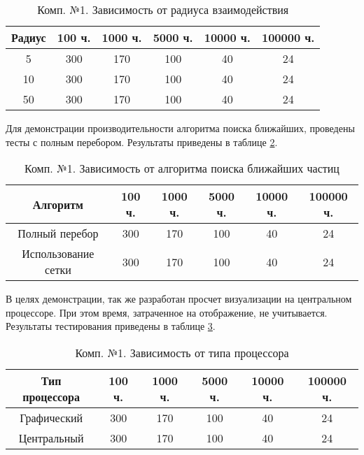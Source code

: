 \begin{table}[H]
  \caption{\label{tab:fst:radius}Комп. №1. Зависимость от радиуса взаимодействия}
  \begin{center}
    \begin{tabular}{|c|c|c|c|c|c|}
      \hline
      Радиус & 100 ч. & 1000 ч. & 5000 ч. & 10000 ч. & 100000 ч. \\
      \hline
      5 & 300 & 170 & 100 & 40 & 24 \\
      10 & 300 & 170 & 100 & 40 & 24 \\
      50 & 300 & 170 & 100 & 40 & 24 \\
      \hline
    \end{tabular}
  \end{center}
\end{table}

Для демонстрации производительности алгоритма поиска ближайших, проведены
тесты с полным перебором. Результаты приведены в таблице \ref{tab:fst:algorithm}.

\begin{table}[H]
  \caption{\label{tab:fst:algorithm}Комп. №1. Зависимость от алгоритма поиска ближайших частиц}
  \begin{center}
    \begin{tabular}{|c|c|c|c|c|c|}
      \hline
      Алгоритм & 100 ч. & 1000 ч. & 5000 ч. & 10000 ч. & 100000 ч. \\
      \hline
      Полный перебор & 300 & 170 & 100 & 40 & 24 \\
      Использование сетки & 300 & 170 & 100 & 40 & 24 \\
      \hline
    \end{tabular}
  \end{center}
\end{table}

В целях демонстрации, так же разработан просчет визуализации на центральном процессоре.
При этом время, затраченное на отображение, не учитывается. Результаты тестирования 
приведены в таблице \ref{tab:fst:cpu}.  \\

\begin{table}[H]
  \caption{\label{tab:fst:cpu}Комп. №1. Зависимость от типа процессора}
  \begin{center}
    \begin{tabular}{|c|c|c|c|c|c|}
      \hline
      Тип процессора & 100 ч. & 1000 ч. & 5000 ч. & 10000 ч. & 100000 ч. \\
      \hline
      Графический & 300 & 170 & 100 & 40 & 24 \\
      Центральный & 300 & 170 & 100 & 40 & 24 \\
      \hline
    \end{tabular}
  \end{center}
\end{table}

